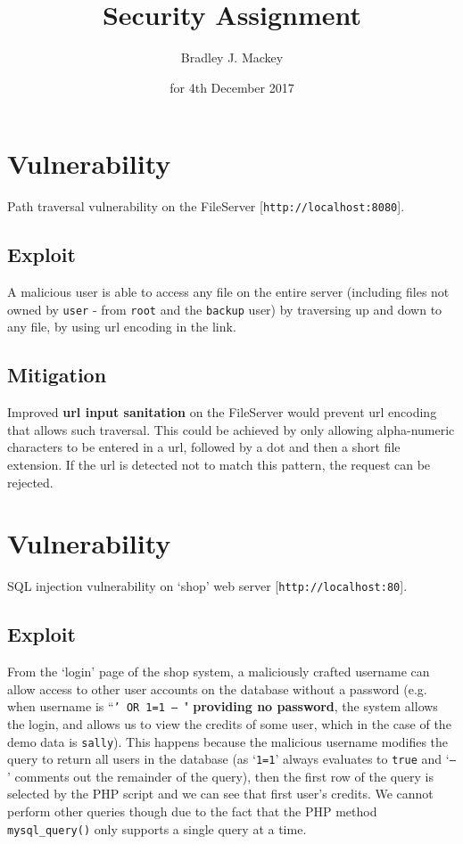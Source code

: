\documentclass[11pt]{article}
\begin{document}
\title{\textbf{Security Assignment}}
\date{for 4th December 2017}
\author{Bradley J. Mackey}
\maketitle

\section{Vulnerability}

Path traversal vulnerability on the FileServer [\texttt{http://localhost:8080}].

\subsection{Exploit}

A malicious user is able to access any file on the entire server (including files not owned by \texttt{user} - from \texttt{root} and the \texttt{backup} user) by traversing up and down to any file, by using url encoding in the link.

\subsection{Mitigation}

Improved \textbf{url input sanitation} on the FileServer would prevent url encoding that allows such traversal. This could be achieved by only allowing alpha-numeric characters to be entered in a url, followed by a dot and then a short file extension. If the url is detected not to match this pattern, the request can be rejected.

\section{Vulnerability}

SQL injection vulnerability on `shop' web server [\texttt{http://localhost:80}].

\subsection{Exploit}

From the `login' page of the shop system, a maliciously crafted username can allow access to other user accounts on the database without a password (e.g. when username is ``\texttt{' OR 1=1 -- }" \textbf{providing no password}, the system allows the login, and allows us to view the credits of some user, which in the case of the demo data is \texttt{sally}). This happens because the malicious username modifies the query to return all users in the database (as `\texttt{1=1}' always evaluates to \texttt{true} and `\texttt{-- }' comments out the remainder of the query), then the first row of the query is selected by the PHP script and we can see that first user's credits. We cannot perform other queries though due to the fact that the PHP method \texttt{mysql\_query()} only supports a single query at a time.
\end{document}
